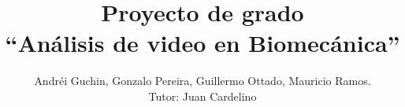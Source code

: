 \documentclass[11pt,a4paper,titlepage,spanish]{article}
\title{Proyecto de grado\\ ``Análisis de video en Biomecánica''}
\author{Andréi Guchin, Gonzalo Pereira, Guillermo Ottado, Mauricio Ramos. \\
Tutor: Juan Cardelino}
\date {}
\begin{document}
\maketitle

\newpage
\tableofcontents
\newpage

\begin{abstract}
\begin{center}
\begin{minipage}{.8\textwidth}

\end{minipage}
\end{center}
\end{abstract}

\newpage\null\thispagestyle{empty}\newpage

\clearpage
\vspace*{\fill}
\begin{center}
\begin{minipage}{.8\textwidth}

\end{minipage}
\end{center}
\vfill %

\newpage\null\thispagestyle{empty}\newpage


\clearpage

\clearpage

\clearpage

\clearpage

\clearpage

\clearpage

\clearpage

\clearpage

\clearpage

%
\clearpage

\clearpage

\clearpage

\clearpage

\clearpage


\nocite{*} %


\end{document}
